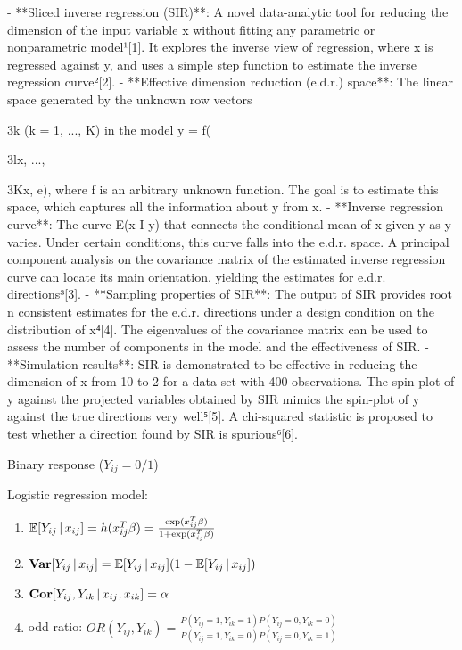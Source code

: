 \documentclass[UTF8,a4paper,10pt]{article}
\begin{document}
- **Sliced inverse regression (SIR)**: A novel data-analytic tool for reducing the dimension of the input variable x without fitting any parametric or nonparametric model¹[1]. It explores the inverse view of regression, where x is regressed against y, and uses a simple step function to estimate the inverse regression curve²[2].
- **Effective dimension reduction (e.d.r.) space**: The linear space generated by the unknown row vectors {3k (k = 1, ..., K) in the model y = f({3lx, ..., {3Kx, e), where f is an arbitrary unknown function. The goal is to estimate this space, which captures all the information about y from x.
- **Inverse regression curve**: The curve E(x I y) that connects the conditional mean of x given y as y varies. Under certain conditions, this curve falls into the e.d.r. space. A principal component analysis on the covariance matrix of the estimated inverse regression curve can locate its main orientation, yielding the estimates for e.d.r. directions³[3].
- **Sampling properties of SIR**: The output of SIR provides root n consistent estimates for the e.d.r. directions under a design condition on the distribution of x⁴[4]. The eigenvalues of the covariance matrix can be used to assess the number of components in the model and the effectiveness of SIR.
- **Simulation results**: SIR is demonstrated to be effective in reducing the dimension of x from 10 to 2 for a data set with 400 observations. The spin-plot of y against the projected variables obtained by SIR mimics the spin-plot of y against the true directions very well⁵[5]. A chi-squared statistic is proposed to test whether a direction found by SIR is spurious⁶[6].

\pagebreak

  \begin{Problem}[]{}
    Binary response (\(Y_{ij}=0/1\))

    Logistic regression model:
\begin{enumerate}
  \item \(\operatorname{\mathbb{E}}[Y_{ij}\,|\,x_{ij}] = h(x_{ij}^T\beta) = \frac{\exp(x_{ij}^T\beta)}{1+\exp(x_{ij}^T\beta)}\)
  \item \(\operatorname{\textbf{Var}}[Y_{ij}\,|\,x_{ij}] = \operatorname{\mathbb{E}}[Y_{ij}\,|\,x_{ij}](1-\operatorname{\mathbb{E}}[Y_{ij}\,|\,x_{ij}])\)
  \item \(\operatorname{\textbf{Cor}}[Y_{ij},Y_{ik}\,|\,x_{ij},x_{ik}]= \alpha\) 
  \item odd ratio: \(OR(Y_{ij},Y_{ik}) = \frac{P(Y_{ij} = 1,Y_{ik} = 1)P(Y_{ij} = 0,Y_{ik} = 0)}{P(Y_{ij} = 1,Y_{ik} = 0)P(Y_{ij} = 0,Y_{ik} = 1)}\)
\end{enumerate}
    

\end{Problem}}}}
\end{document}
